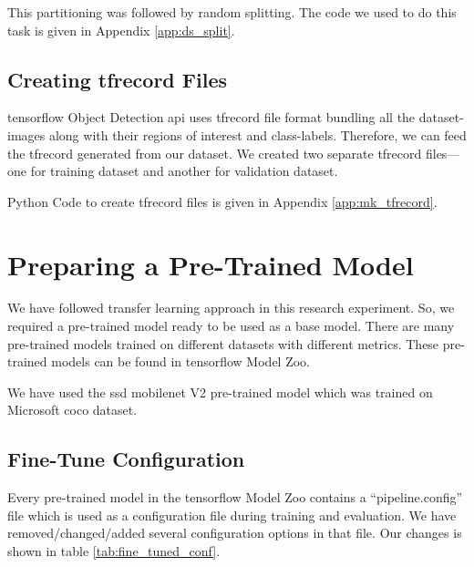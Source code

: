             This partitioning was followed by random splitting. The code we used to do this task is given in Appendix \ref{app:ds_split}.
            
        \subsection{Creating tfrecord Files}
            \gls{tensorflow} Object Detection \acrshort{api} uses \gls{tfrecord} file format bundling all the dataset-images along with their regions of interest and class-labels\cite{bisong2019tensorflow}. Therefore, we can feed the tfrecord generated from our dataset. We created two separate tfrecord files--- one for training dataset and another for validation dataset.
            
            Python Code to create \gls{tfrecord} files is given in Appendix \ref{app:mk_tfrecord}.
            
    \section{Preparing a Pre-Trained Model}
        We have followed transfer learning approach\cite{pan2009survey} in this research experiment. So, we required a pre-trained model ready to be used as a base model. There are many pre-trained models trained on different datasets with different metrics. These pre-trained models can be found in \gls{tensorflow}\cite{dillon2017tensorflow} Model Zoo\cite{tf_model_zoo}.
        
        We have used the \acrshort{ssd}\cite{liu2016ssd} \gls{mobilenet}\cite{howard2017mobilenets} V2 pre-trained model which was trained on Microsoft \acrshort{coco} dataset\cite{lin2014microsoft}.
        
        \subsection{Fine-Tune Configuration}
            Every pre-trained model in the \gls{tensorflow} Model Zoo\cite{tf_model_zoo} contains a ``pipeline.config'' file which is used as a configuration file during training and evaluation. We have removed/changed/added several configuration options in that file. Our changes is shown in table \ref{tab:fine_tuned_conf}.
            

